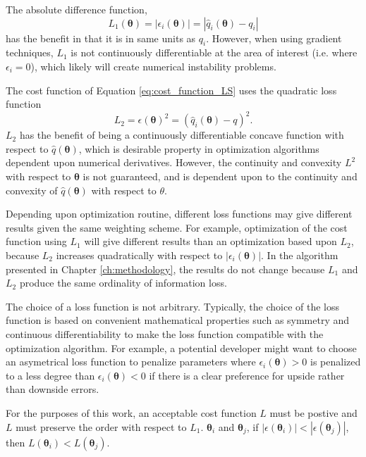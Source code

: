 The absolute difference function,
\begin{equation}
	\label{eq:L1_loss_function}
	L_1(\bm{\theta})
	= |\epsilon_i(\bm{\theta})|
	= |\hat{q}_i(\bm{\theta})-q_i|
\end{equation}
has the benefit in that it is in same units as $q_i$.  However, when using gradient techniques, $L_1$ is not continuously differentiable at the area of interest (i.e. where $\epsilon_i =0$), which likely will create numerical instability problems.

The cost function of Equation \ref{eq:cost_function_LS} uses the quadratic loss function
\begin{equation}
	\label{eq:L2_loss_function}
  L_2
	=\epsilon(\bm{\theta})^2
	=(\hat{q}_i(\bm{\theta})-q)^2.
\end{equation}
$L_2$ has the benefit of being a continuously differentiable concave function with respect to $\hat{q}(\bm{\theta})$, which is desirable property in optimization algorithms dependent upon numerical derivatives.  However, the continuity and convexity $L^2$ with respect to $\bm{\theta}$ is not guaranteed, and is dependent upon to the continuity and convexity of $\hat{q}(\bm{\theta})$ with respect to $\theta$.

Depending upon optimization routine, different loss functions may give different results given the same weighting scheme.  For example, optimization of the cost function using $L_1$ will give different results than an optimization based upon $L_2$, because $L_2$ increases quadratically with respect to $|\epsilon_i(\bm{\theta})|$.  In the algorithm presented in Chapter \ref{ch:methodology}, the results do not change because $L_1$ and $L_2$ produce the same ordinality of information loss.

The choice of a loss function is not arbitrary.  Typically, the choice of the loss function is based on convenient mathematical properties such as symmetry and continuous differentiability to make the loss function compatible with the optimization algorithm.  For example, a potential developer might want to choose an asymetrical loss function to penalize parameters where $\epsilon_i(\bm{\theta}) > 0$ is penalized to a less degree than $\epsilon_i(\bm{\theta}) < 0$ if there is a clear preference for upside rather than downside errors.

For the purposes of this work, an acceptable cost function $L$ must be postive and $L$ must preserve the order with respect to $L_1$.   $\bm{\theta}_i$ and $\bm{\theta}_j$, if $|\epsilon(\bm{\theta}_i)| < |\epsilon(\bm{\theta}_j)|$, then $L(\bm{\theta}_i) < L(\bm{\theta}_j)$.

